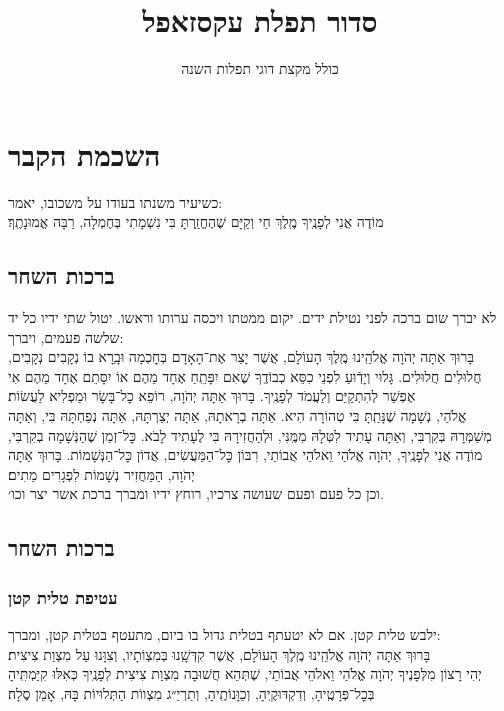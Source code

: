 \documentclass[12pt,letterpaper]{siddur}
\title{סדור תפלת עקסזאפל}
\subtitle{כולל מקצת דוגי תפלות השנה}
\begin{document}
\frontmatter
\maketitle
\tableofcontents
\mainmatter
\chapter{השכמת הקבר}
\scriptsize{\textsf{כשיעיר משנתו בעודו על משכובו, יאמר:}}\\\normalsize
מוֹדֶה אֲנִי לְפָנֶֽיךָ מֶֽלֶךְ חַי וְקַיָּם שֶׁהֶחֱזַֽרְתָּ בִּי נִשְׁמָתִי בְּחֶמְלָה, רַבָּה אֱמוּנָתֶֽךָ׃
\section{ברכות השחר}
\scriptsize{\textsf{לא יברך שום ברכה לפני נטילת ידים. יקום ממטתו ויכסה ערותו וראשו. יטול שתי ידיו כל יד שלשה פעמים, ויברך:}}\normalsize\\
בָּרוּךְ אַתָּה יְהֹוָה אֱלֹהֵֽינוּ מֶֽלֶךְ הָעוֹלָם, אֲשֶׁר יָצַר אֶת־הָאָדָם בְּחׇכְמָה וּבָֽרָא בוֹ נְקָבִים נְקָבִים, חֲלוּלִים חֲלוּלִים. גָּלוּי וְיָדֽֿוּעַ לִפְנֵי כִסֵּא כְבוֹדֶֽךָ שֶׁאִם יִפָּתֵֽחַ אֶחָד מֵהֶם אוֹ יִסָּתֵם אֶחָד מֵהֶם אִי אֶפְשַׁר לְהִתְקַיֵּם וְלַעֲמֹד לְפָנֶֽיךָ. בָּרוּךְ אַתָּה יְהֹוָה, רוֹפֵא כׇל־בָּשָׂר וּמַפְלִיא לַעֲשׂוֹת׃\\
אֱלֹהַי, נְשָׁמָה שֶׁנָּתַֽתָּ בִּי טְהוֹרָה הִיא. אַתָּה בְרָאתָהּ, אַתָּה יְצַרְתָּהּ, אַתָּה נְפַחְתָּהּ בִּי, וְאַתָּה מְשַׁמְּרָהּ בְּקִרְבִּי, וְאַתָּה עָתִיד לִטְּלָהּ מִמֶּֽנִּי, וּלְהַחֲזִירָהּ בִּי לֶעָתִיד לָבֹא. כׇּל־זְמַן שֶׁהַנְּשָׁמָה בְקִרְבִּי, מוֹדֶה אֲנִי לְפָנֶֽיךָ, יְהֹוָה אֱלֹהַי וֵאלֹהֵי אֲבוֹתַי, רִבּוֹן כׇּל־הַמַּעֲשִׂים, אֲדוֹן כׇּל־הַנְּשָׁמוֹת. בָּרוּךְ אַתָּה יְהֹוָה, הַמַּחֲזִיר נְשָׁמוֹת לִפְגָרִים מֵתִים׃\\
\scriptsize{\textsf{וכן כל פעם ופעם שעושה צרכיו, רוחץ ידיו ומברך ברכת אשר יצר וכו׳.}}\normalsize
\section{ברכות השחר}
\subsection{עטיפת טלית קטן}
\scriptsize{\textsf{ילבש טלית קטן. אם לא יטעתף בטלית גדול בו ביום, מתעטף בטלית קטן, ומברך:}}\normalsize\\
בָּרוּךְ אַתָּה יְהֹוָה אֱלֹהֵֽינוּ מֶֽלֶךְ הָעוֹלָם, אֲשֶׁר קִדְּשָֽׁנוּ בְּמִצְוֹתָיו, וְצִוָּנוּ עַל מִצְוַת צִיצִית׃\smallskip\\
יְהִי רָצוֹן מִלְּפָנֶיךָ יְהֹוָה אֱלֹהַי וֵאלֹהֵי אֲבוֹתַי, שֶׁתְּהֵא חֲשׁוּבָה מִצְוַת צִיצִית לְפָנֶֽיךָ כְּאִלּוּ קִיַּמְתִּֽיהָ בְּכׇל־פְּרָטֶֽיהָ, וְדִקְדּוּקֶֽיהָ, וְכַוָּנוֹתֶֽיהָ, וְתַרְיַ״ג מִצְווֹת הַתְּלוּיוֹת בָּהּ, אָמֵן סֶלָה׃
\end{document}
